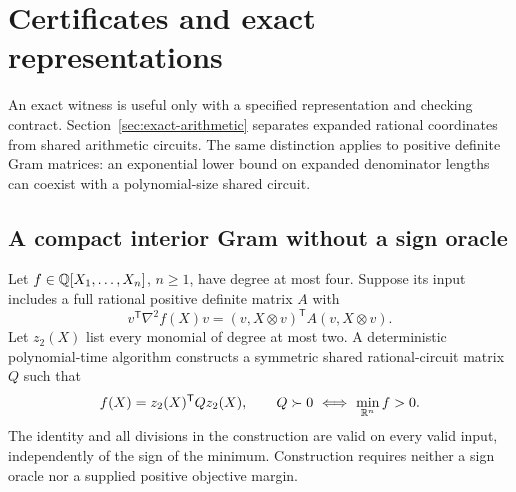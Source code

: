 \section{Certificates and exact representations}
\label{sec:certificates}

An exact witness is useful only with a specified representation and checking
contract. Section~\ref{sec:exact-arithmetic} separates expanded rational
coordinates from shared arithmetic circuits. The same distinction applies to
positive definite Gram matrices: an exponential lower bound on expanded
denominator lengths can coexist with a polynomial-size shared circuit.

\subsection{A compact interior Gram without a sign oracle}

\begin{theorem}
\label{thm:circuit-gram}
Let $f\in\mathbb Q[X_1,\ldots,X_n]$, $n\ge1$, have degree at most four.
Suppose its input includes a full rational positive definite matrix $A$ with
\[
 v^{\mathsf T}\nabla^2f(X)v
  =(v,X\otimes v)^{\mathsf T}A(v,X\otimes v).
\]
Let $z_2(X)$ list every monomial of degree at most two. A deterministic
polynomial-time algorithm constructs a symmetric shared rational-circuit
matrix $Q$ such that
\[
 f(X)=z_2(X)^{\mathsf T}Qz_2(X),\qquad
 Q\succ0\ \Longleftrightarrow\ \min_{\mathbb R^n} f>0.
\]
The identity and all divisions in the construction are valid on every valid
input, independently of the sign of the minimum. Construction requires
neither a sign oracle nor a supplied positive objective margin.
\end{theorem}

